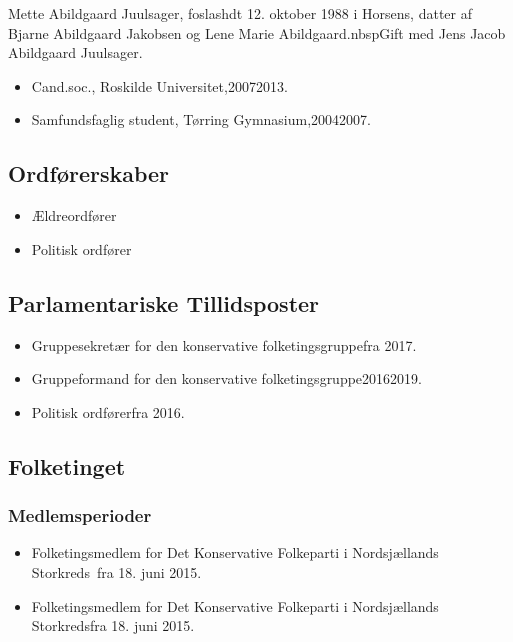 \documentclass[11pt, a4paper]{awesome-cv}
\begin{document}
\makecvheader[R]
\makelettertitle
\begin{cvletter}
Mette Abildgaard Juulsager, foslashdt 12. oktober 1988 i Horsens, datter af Bjarne Abildgaard Jakobsen og Lene Marie Abildgaard.nbspGift med Jens Jacob Abildgaard Juulsager.

\begin{itemize}
\item Cand.soc., Roskilde Universitet,20072013.
\item Samfundsfaglig student, Tørring Gymnasium,20042007.
\end{itemize}
\subsection*{Ordførerskaber}
\begin{itemize}
\item Ældreordfører
\item Politisk ordfører
\end{itemize}
\subsection*{Parlamentariske Tillidsposter}
\begin{itemize}
\item Gruppesekretær for den konservative folketingsgruppefra 2017.
\item Gruppeformand for den konservative folketingsgruppe20162019.
\item Politisk ordførerfra 2016.
\end{itemize}
\subsection*{Folketinget}
\subsubsection*{Medlemsperioder}
\begin{itemize}
\item Folketingsmedlem for Det Konservative Folkeparti i Nordsjællands Storkreds fra 18. juni 2015.
\item Folketingsmedlem for Det Konservative Folkeparti i Nordsjællands Storkredsfra 18. juni 2015.
\end{itemize}

\end{cvletter}
\end{document}
